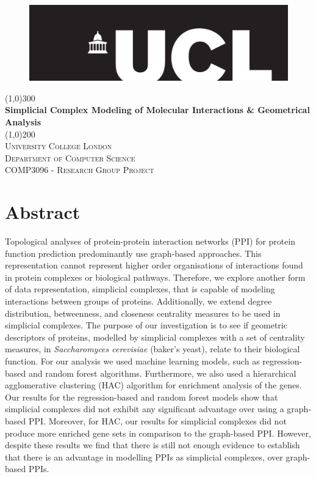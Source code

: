 \documentclass[9pt]{article}
\begin{document}
\begin{titlepage}
\begin{center}
\begin{figure}[t]
\hspace*{0.35cm}\includegraphics[width=1.0\textwidth]{uclLogo}\\
\end{figure}
\line(1,0){300}\\
[0.25in]
\huge{\bfseries Simplicial Complex Modeling of Molecular Interactions \& Geometrical Analysis}\\
[2mm]
\line(1,0){200}\\
[1.5cm]
\textsc{\LARGE University College London}\\
\textsc{\normalsize Department of Computer Science}\\
\textsc{\normalsize COMP3096 - Research Group Project}\\
[5cm]
\end{center}

\end{titlepage}

\newpage
\section{Abstract}\label{sec:abstract}
Topological analyses of protein-protein interaction networks (PPI) for protein function prediction predominantly use graph-based approaches. This representation cannot represent higher order organisations of interactions found in protein complexes or biological pathways. Therefore, we explore another form of data representation, simplicial complexes, that is capable of modeling interactions between groups of proteins. Additionally, we extend degree distribution, betweenness, and closeness centrality measures to be used in simplicial complexes. The purpose of our investigation is to see if geometric descriptors of proteins, modelled by simplicial complexes with a set of centrality measures, in \textit{Saccharomyces cerevisiae} (baker’s yeast), relate to their biological function. For our analysis we used machine learning models, such as regression-based and random forest algorithms. Furthermore, we also used a hierarchical agglomerative clustering (HAC) algorithm for enrichment analysis of the genes. Our results for the regression-based and random forest models show that simplicial complexes did not exhibit any significant advantage over using a graph-based PPI. Moreover, for HAC, our results for simplicial complexes did not produce more enriched gene sets in comparison to the graph-based PPI. However, despite these results we find that there is still not enough evidence to establish that there is an advantage in modelling PPIs as simplicial complexes, over graph-based PPIs.
\end{document}
